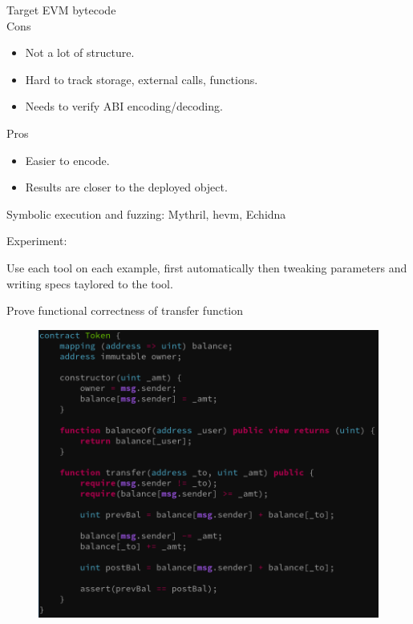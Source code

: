 \documentclass[aspectratio=169,10pt]{beamer}
\begin{document}
\begin{frame}[fragile]
Target EVM bytecode\\
Cons
\begin{itemize}
\item Not a lot of structure.
\item Hard to track storage, external calls, functions.
\item Needs to verify ABI encoding/decoding.
\end{itemize}
Pros\\
\begin{itemize}
\item Easier to encode.
\item Results are closer to the deployed object.
\end{itemize}
Symbolic execution and fuzzing: Mythril, hevm, Echidna
\end{frame}

\begin{frame}[fragile]
Experiment:
\begin{center}
Use each tool on each example, first automatically then tweaking parameters and writing specs taylored to the tool.
\end{center}
\end{frame}

\begin{frame}[fragile]
\begin{center}
Prove functional correctness of transfer function
\begin{figure}
	\includegraphics[scale=0.3]{images/token_pass}
\end{figure}
\end{center}
\end{frame}
\end{document}
